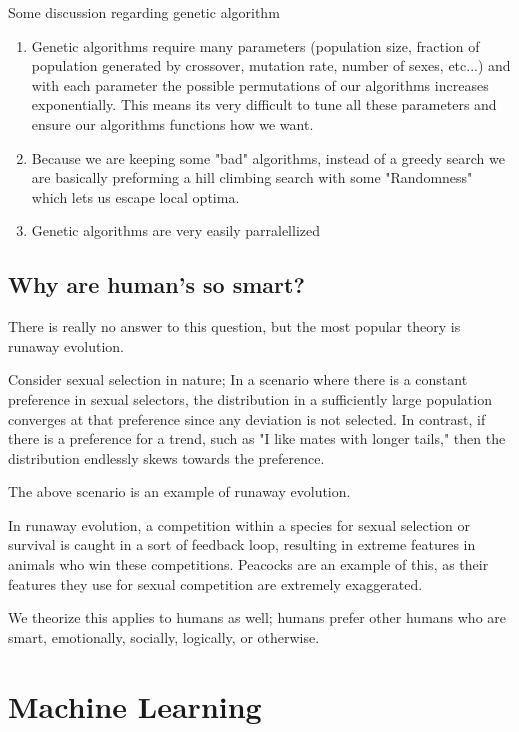 \documentclass{chezarticle}
\begin{document}
\begin{note}
Some discussion regarding genetic algorithm
\begin{enumerate}
    \item  Genetic algorithms require many parameters (population size, fraction of population generated by crossover, mutation rate, number of sexes, etc...) and with each parameter the possible permutations of our algorithms increases exponentially. This means its very difficult to tune all these parameters and ensure our algorithms functions how we want.
    \item Because we are keeping some "bad" algorithms, instead of a greedy search we are basically preforming a hill climbing search with some "Randomness" which lets us escape local optima.
    \item Genetic algorithms are very easily parralellized
\end{enumerate}
\end{note}
\subsection{Why are human's so smart?}
There is really no answer to this question, but the most popular theory is runaway evolution. 
\begin{proposition}
Consider sexual selection in nature; In a scenario where there is a constant preference in sexual selectors, the distribution  in a sufficiently large population converges at that preference since any deviation is not selected. In contrast, if there is a preference for a trend, such as "I like mates with longer tails," then the distribution endlessly skews towards the preference. 
\end{proposition}
The above scenario is an example of runaway evolution.
\begin{definition}
In runaway evolution, a competition within a species for sexual selection or survival is caught in a sort of feedback loop, resulting in extreme features in animals who win these competitions. Peacocks are an example of this, as their features they use for sexual competition are extremely exaggerated.
\end{definition}
We theorize this applies to humans as well; humans prefer other humans who are smart, emotionally, socially, logically, or otherwise.

\section{Machine Learning}
\end{document}
